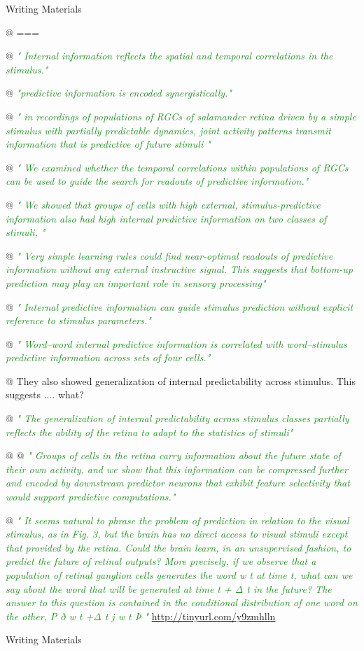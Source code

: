 \documentclass[utf8]{article}
\newenvironment{writingMaterials}
			{	
			\begin{tcolorbox}[size=small, colframe=black!20!white, toprule=1mm]
				Writing Materials
			\end{tcolorbox}
			
			\begin{easylist}[itemize]		
			}
			{
			\end{easylist}
			\begin{tcolorbox}[size=small, bottomrule=1mm, halign=flush right, colframe=black!20!white]
				Writing Materials
			\end{tcolorbox}			
			}
\newcommand{\rewrite}[1]{\textcolor{ForestGreen}{\textit{"#1"}}\newline}
\begin{document}
				
			\begin{writingMaterials}
				@ ===
				
				@ \rewrite{
					Internal information reflects the spatial and temporal correlations in the stimulus.}
				
				@ \rewrite{predictive information is encoded synergistically.}
				
				@ \rewrite{
					in recordings of populations of RGCs of salamander retina driven by a simple stimulus with partially predictable dynamics, joint activity patterns transmit information that is predictive of future stimuli }
				
				@ \rewrite{
					We examined whether the temporal correlations within populations of RGCs can be used to guide the search for readouts of predictive information.}
				
				@ \rewrite{
					We showed that groups of cells with high external, stimulus-predictive information also had high internal predictive information on two classes of stimuli, }
				
				@ \rewrite{
					Very simple learning rules could find near-optimal readouts of predictive information without any external instructive signal. This suggests that bottom-up prediction may play an important role in sensory processing}
				
				@ \rewrite{
					Internal predictive information can guide stimulus prediction without explicit reference to stimulus parameters.}
				
				@ \rewrite{
					Word–word internal predictive information is correlated with word–stimulus predictive information across sets of four cells.}
				
				@ They also showed generalization of internal predictability across stimulus. This suggests .... what?
				
				@ \rewrite{
					The generalization of internal predictability across stimulus classes partially reflects the ability of the retina to adapt to the statistics of stimuli}
				
				
				@ \cite{Palmer2015}
				@ \rewrite{
					Groups of cells in the retina carry information about the future state of their own activity, and we show that this information can be compressed further and encoded by downstream predictor neurons that exhibit feature selectivity that would support predictive computations.}
				
				@ \rewrite{
					It seems natural to phrase the problem of prediction in relation to the visual stimulus, as in Fig. 3, but the brain has no direct access to visual stimuli except that provided by the retina. Could the brain learn, in an unsupervised fashion, to predict the future of retinal outputs? More precisely, if we observe that a population of retinal ganglion cells generates the word w t at time t, what can we say about the word that will be generated at time t + Δ t in the future? The answer to this question is contained in the conditional distribution of one word on the other, P ð w t +Δ t j w t Þ } \url{http://tinyurl.com/y9zmhlln}	
				

\end{writingMaterials}
\end{document}
